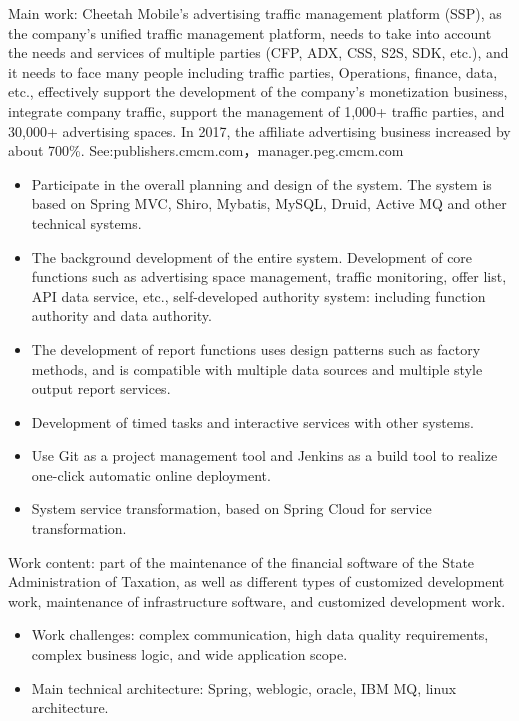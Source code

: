 \documentclass{resume}
\begin{document}
\begin{onehalfspacing}
Main work: Cheetah Mobile’s advertising traffic management platform (SSP), as the company’s unified traffic management platform, needs to take into account the needs and services of multiple parties (CFP, ADX, CSS, S2S, SDK, etc.), and it needs to face many people including traffic parties, Operations, finance, data, etc., effectively support the development of the company's monetization business, integrate company traffic, support the management of 1,000+ traffic parties, and 30,000+ advertising spaces. In 2017, the affiliate advertising business increased by about 700\%. See:publishers.cmcm.com，manager.peg.cmcm.com
\begin{itemize}
  \item Participate in the overall planning and design of the system. The system is based on Spring MVC, Shiro, Mybatis, MySQL, Druid, Active MQ and other technical systems.
  \item The background development of the entire system. Development of core functions such as advertising space management, traffic monitoring, offer list, API data service, etc., self-developed authority system: including function authority and data authority.
  \item The development of report functions uses design patterns such as factory methods, and is compatible with multiple data sources and multiple style output report services.
  \item Development of timed tasks and interactive services with other systems.
  \item Use Git as a project management tool and Jenkins as a build tool to realize one-click automatic online deployment.
  \item System service transformation, based on Spring Cloud for service transformation. 
\end{itemize}
\end{onehalfspacing}

\begin{onehalfspacing}
Work content: part of the maintenance of the financial software of the State Administration of Taxation, as well as different types of customized development work, maintenance of infrastructure software, and customized development work.
\begin{itemize}
  \item Work challenges: complex communication, high data quality requirements, complex business logic, and wide application scope.
  \item Main technical architecture: Spring, weblogic, oracle, IBM MQ, linux architecture.
\end{itemize}
\end{onehalfspacing}
\end{document}
